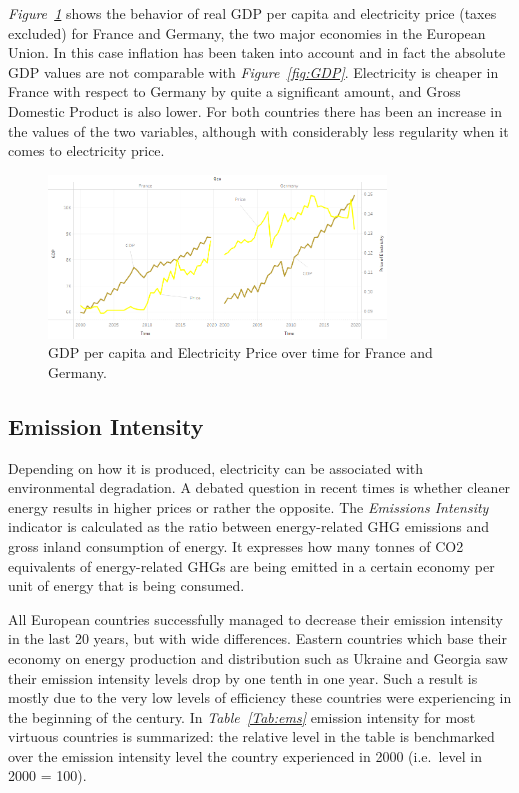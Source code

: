 \documentclass[a4paper,12pt]{book}
\begin{document}
\textit{Figure~\ref{fig:pri-gdp}} shows the behavior of real GDP per capita and electricity price (taxes excluded) for France and Germany, the two major economies in the European Union.  In this case inflation has been taken into account and in fact the absolute GDP values are not comparable with \textit{Figure~\ref{fig:GDP}}. Electricity is cheaper in France with respect to Germany by quite a significant amount, and Gross Domestic Product is also lower. For both countries there has been an increase in the values of the two variables, although with considerably less regularity when it comes to electricity price.

\begin{figure}[tb]
\begin{center}
\captionsetup{justification=centering}
\includegraphics[width=0.8\textwidth]{Images/pri-gdp.png}
\caption{GDP per capita and Electricity Price over time for France and Germany.}
\label{fig:pri-gdp}
\end{center}
\end{figure}

\subsection*{Emission Intensity}

Depending on how it is produced, electricity can be associated with environmental degradation. A debated question in recent times is whether cleaner energy results in higher prices or rather the opposite. The \textit{Emissions Intensity} indicator is calculated as the ratio between energy-related GHG emissions and gross inland consumption of energy. It expresses how many tonnes of CO2 equivalents of energy-related GHGs are being emitted in a certain economy per unit of energy that is being consumed.

All European countries successfully managed to decrease their emission intensity in the last 20 years, but with wide differences. Eastern countries which base their economy on energy production and distribution such as Ukraine and Georgia saw their emission intensity levels drop by one tenth in one year. Such a result is mostly due to the very low levels of efficiency these countries were experiencing in the beginning of the century. In \textit{Table~\ref{Tab:ems}} emission intensity for most virtuous countries is summarized: the relative level in the table is benchmarked over the emission intensity level the country experienced in 2000 (i.e.\ level in 2000 = 100).
\end{document}

